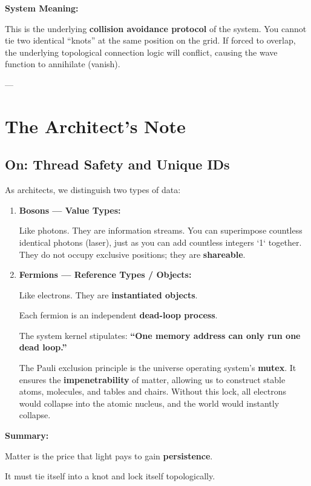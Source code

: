 \documentclass[11pt,a4paper,twoside]{book}
\begin{document}
\textbf{System Meaning:}

This is the underlying \textbf{collision avoidance protocol} of the system. You cannot tie two identical ``knots'' at the same position on the grid. If forced to overlap, the underlying topological connection logic will conflict, causing the wave function to annihilate (vanish).

---

\section{The Architect's Note}

\subsection{On: Thread Safety and Unique IDs}

As architects, we distinguish two types of data:

\begin{enumerate}
\item \textbf{Bosons --- Value Types:}

    Like photons. They are information streams. You can superimpose countless identical photons (laser), just as you can add countless integers `1` together. They do not occupy exclusive positions; they are \textbf{shareable}.

\item \textbf{Fermions --- Reference Types / Objects:}

    Like electrons. They are \textbf{instantiated objects}.

    Each fermion is an independent \textbf{dead-loop process}.

    The system kernel stipulates: \textbf{``One memory address can only run one dead loop.''}

    The Pauli exclusion principle is the universe operating system's \textbf{mutex}. It ensures the \textbf{impenetrability} of matter, allowing us to construct stable atoms, molecules, and tables and chairs. Without this lock, all electrons would collapse into the atomic nucleus, and the world would instantly collapse.
\end{enumerate}

\textbf{Summary:}

Matter is the price that light pays to gain \textbf{persistence}.

It must tie itself into a knot and lock itself topologically.
\end{document}
